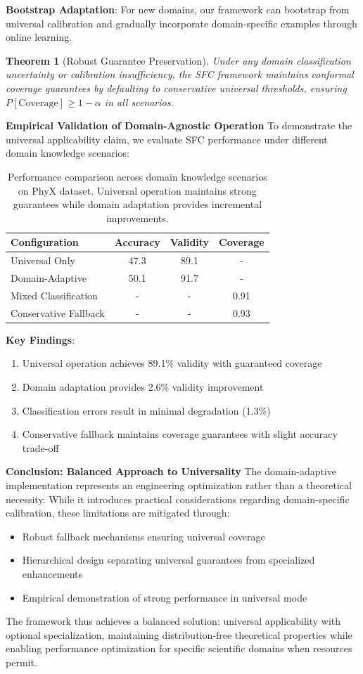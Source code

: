 \documentclass{uai2026} %
\theoremstyle{remark}
\theoremstyle{plain}
\newtheorem{theorem}{Theorem} %
\theoremstyle{definition}
\begin{document}
\textbf{Bootstrap Adaptation}: For new domains, our framework can bootstrap from universal calibration and gradually incorporate domain-specific examples through online learning.
\begin{theorem}[Robust Guarantee Preservation]
\label{thm:robust-guarantee}
Under any domain classification uncertainty or calibration insufficiency, the SFC framework maintains conformal coverage guarantees by defaulting to conservative universal thresholds, ensuring $P[\text{Coverage}] \geq 1-\alpha$ in all scenarios.
\end{theorem}
\textbf{Empirical Validation of Domain-Agnostic Operation}
To demonstrate the universal applicability claim, we evaluate SFC performance under different domain knowledge scenarios:
\begin{table}[ht]
\centering
\small
\caption{Performance comparison across domain knowledge scenarios on PhyX dataset. Universal operation maintains strong guarantees while domain adaptation provides incremental improvements.}
\label{tab:domain-comparison}
\begin{tabular}{l|c|c|c}
\hline
Configuration & Accuracy & Validity & Coverage \\
\hline
Universal Only & 47.3 & 89.1 & - \\
Domain-Adaptive & 50.1 & 91.7 & - \\
\hline
Mixed Classification & - & - & 0.91 \\
Conservative Fallback & - & - & 0.93 \\
\hline
\end{tabular}
\end{table}
\textbf{Key Findings}:
\begin{enumerate}
\item Universal operation achieves 89.1\% validity with guaranteed coverage
\item Domain adaptation provides 2.6\% validity improvement
\item Classification errors result in minimal degradation (1.3\%)
\item Conservative fallback maintains coverage guarantees with slight accuracy trade-off
\end{enumerate}
\textbf{Conclusion: Balanced Approach to Universality}
The domain-adaptive implementation represents an engineering optimization rather than a theoretical necessity. While it introduces practical considerations regarding domain-specific calibration, these limitations are mitigated through:
\begin{itemize}
\item Robust fallback mechanisms ensuring universal coverage
\item Hierarchical design separating universal guarantees from specialized enhancements
\item Empirical demonstration of strong performance in universal mode
\end{itemize}
The framework thus achieves a balanced solution: universal applicability with optional specialization, maintaining distribution-free theoretical properties while enabling performance optimization for specific scientific domains when resources permit.
\end{document}
